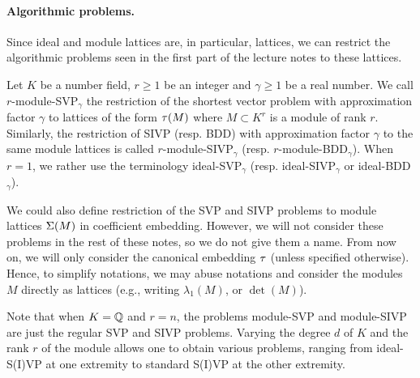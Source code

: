
\paragraph{Algorithmic problems.} Since ideal and module lattices are, in particular, lattices, we can restrict the algorithmic problems seen in the first part of the lecture notes to these lattices.

\begin{definition}
Let $K$ be a number field, $r \geq 1$ be an integer and $\gamma \geq 1$ be a real number. We call $r$-module-SVP$_\gamma$ the restriction of the shortest vector problem with approximation factor $\gamma$ to lattices of the form $\tau(M)$ where $M \subset K^r$ is a module of rank $r$.
Similarly, the restriction of SIVP (resp. BDD) with approximation factor $\gamma$ to the same module lattices is called $r$-module-SIVP$_\gamma$ (resp. $r$-module-BDD$_\gamma$).
When $r = 1$, we rather use the terminology ideal-SVP$_\gamma$ (resp. ideal-SIVP$_\gamma$ or ideal-BDD$_\gamma$).
\end{definition}

We could also define restriction of the SVP and SIVP problems to module lattices $\Sigma(M)$ in coefficient embedding. However, we will not consider these problems in the rest of these notes, so we do not give them a name. From now on, we will only consider the canonical embedding $\tau$ (unless specified otherwise). Hence, to simplify notations, we may abuse notations and consider the modules $M$ directly as lattices (e.g., writing $\lambda_1(M)$, or $\det(M)$).

Note that when $K = \mathbb{Q}$ and $r = n$, the problems module-SVP and module-SIVP are just the regular SVP and SIVP problems. Varying the degree $d$ of $K$ and the rank $r$ of the module allows one to obtain various problems, ranging from ideal-S(I)VP at one extremity to standard S(I)VP at the other extremity.

